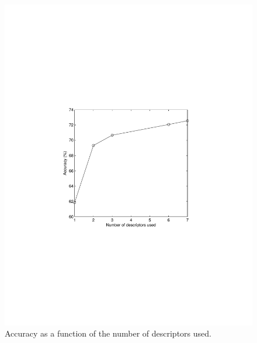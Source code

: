 \documentclass{acm_proc_article-sp}
\begin{document}
\begin{figure} 
\includegraphics[trim=3cm 9cm 3cm 9cm, width=1\linewidth]{Fig.pdf}
\caption{Accuracy as a function of the number of descriptors used.}
\end{figure}



\balancecolumns
\end{document}
